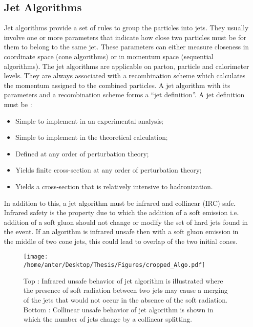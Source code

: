 \subsection{Jet Algorithms}
\label{sec:jet_algos}
Jet algorithms \cite{Salam:2009jx} provide a set of rules to group the particles into jets. They usually involve one or more parameters that indicate how close two particles must be for them to belong to the same jet. These parameters can either measure closeness in coordinate space (cone algorithms) or in momentum space (sequential algorithms). The jet algorithms are applicable on parton, particle and calorimeter levels. They are always associated with a recombination scheme which calculates the momentum assigned to the combined particles. A jet algorithm with its parameters and a recombination scheme forms a ``jet definition''. A jet definition must be \cite{Ellis:1989vm} :
\begin{itemize}
\item Simple to implement in an experimental analysis;
\item Simple to implement in the theoretical calculation;
\item Defined at any order of perturbation theory;
\item Yields finite cross-section at any order of perturbation theory;
\item Yields a cross-section that is relatively intensive to hadronization.
\end{itemize}
In addition to this, a jet algorithm must be infrared and collinear (IRC) safe. Infrared safety is the property due to which the addition of a soft emission i.e. addition of a soft gluon should not change or modify the set of hard jets found in the event. If an algorithm is infrared unsafe then with a soft gluon emission in the middle of two cone jets, this could lead to overlap of the two initial cones. 
\begin{figure}[h!]
\begin{center} 
\texttt{[image: /home/anter/Desktop/Thesis/Figures/cropped\_Algo.pdf]}
\caption[Effects of emission of infrared radiations and collinear splitting in jet algorithms.]{Top : Infrared unsafe behavior of jet algorithm is illustrated where the presence of soft radiation between two jets may cause a merging of the jets that would not occur in the absence of the soft radiation. Bottom : Collinear unsafe behavior of jet algorithm is shown in which the number of jets change by a collinear splitting\footnotemark.}
\label{fig:IRC}
\end{center}
\end{figure} 
